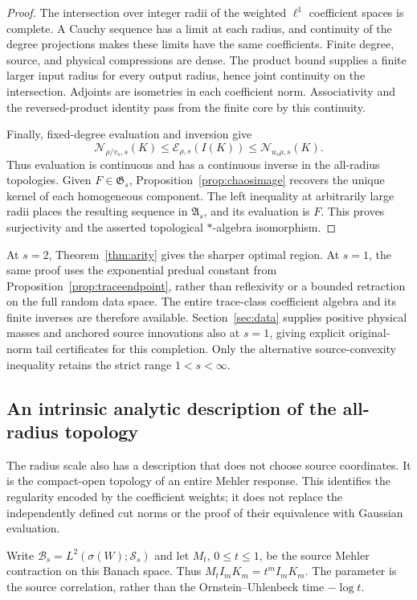 \documentclass[11pt,a4paper]{amsart}
\numberwithin{equation}{section}
\theoremstyle{definition}
\theoremstyle{remark}
\newcommand{\Sch}{\mathcal S}
\newcommand{\Alg}{\mathfrak A}
\newcommand{\Gaus}{\mathfrak G}
\newcommand{\Nn}[2]{\mathcal N_{#1,s}(#2)}
\newcommand{\En}[2]{\mathcal E_{#1,s}(#2)}
\begin{document}
\begin{proof}
The intersection over integer radii of the weighted $\ell^1$ coefficient spaces is complete. A Cauchy sequence has a limit at each radius, and continuity of the degree projections makes these limits have the same coefficients. Finite degree, source, and physical compressions are dense. The product bound supplies a finite larger input radius for every output radius, hence joint continuity on the intersection. Adjoints are isometries in each coefficient norm. Associativity and the reversed-product identity pass from the finite core by this continuity.

Finally, fixed-degree evaluation and inversion give
\begin{equation}\label{eq:scaletopology}
 \Nn{\rho/v_s}K\le\En\rho{I(K)}\le\Nn{u_s\rho}K.
\end{equation}
Thus evaluation is continuous and has a continuous inverse in the all-radius topologies. Given $F\in\Gaus_s$, Proposition~\ref{prop:chaosimage} recovers the unique kernel of each homogeneous component. The left inequality at arbitrarily large radii places the resulting sequence in $\Alg_s$, and its evaluation is $F$. This proves surjectivity and the asserted topological $*$-algebra isomorphism.
\end{proof}

At $s=2$, Theorem~\ref{thm:arity} gives the sharper optimal region. At $s=1$, the same proof uses the exponential predual constant from Proposition~\ref{prop:traceendpoint}, rather than reflexivity or a bounded retraction on the full random data space. The entire trace-class coefficient algebra and its finite inverses are therefore available. Section~\ref{sec:data} supplies positive physical masses and anchored source innovations also at $s=1$, giving explicit original-norm tail certificates for this completion. Only the alternative source-convexity inequality retains the strict range $1<s<\infty$.

\subsection{An intrinsic analytic description of the all-radius topology}
The radius scale also has a description that does not choose source coordinates. It is the compact-open topology of an entire Mehler response. This identifies the regularity encoded by the coefficient weights; it does not replace the independently defined cut norms or the proof of their equivalence with Gaussian evaluation.

Write $\mathscr B_s=L^2(\sigma(W);\Sch_s)$ and let $M_t$, $0\le t\le1$, be the source Mehler contraction on this Banach space. Thus $M_tI_mK_m=t^mI_mK_m$. The parameter is the source correlation, rather than the Ornstein--Uhlenbeck time $-\log t$.
\end{document}
